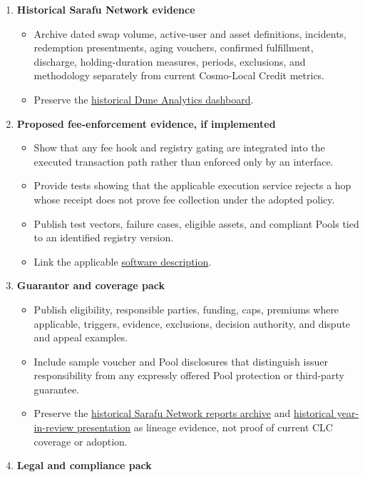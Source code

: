 \documentclass[11pt]{article}
\begin{document}
\begin{enumerate}[leftmargin=*]
\item \textbf{Historical Sarafu Network evidence}
\begin{itemize}[leftmargin=*]
\item Archive dated swap volume, active-user and asset definitions, incidents, redemption presentments, aging vouchers, confirmed fulfillment, discharge, holding-duration measures, periods, exclusions, and methodology separately from current Cosmo-Local Credit metrics.
\item Preserve the \href{https://dune.com/grassrootseconomics/sarafu-network}{historical Dune Analytics dashboard}.
\end{itemize}
\item \textbf{Proposed fee-enforcement evidence, if implemented}
\begin{itemize}[leftmargin=*]
\item Show that any fee hook and registry gating are integrated into the executed transaction path rather than enforced only by an interface.
\item Provide tests showing that the applicable execution service rejects a hop whose receipt does not prove fee collection under the adopted policy.
\item Publish test vectors, failure cases, eligible assets, and compliant Pools tied to an identified registry version.
\item Link the applicable \href{https://software.grassecon.org}{software description}.
\end{itemize}
\item \textbf{Guarantor and coverage pack}
\begin{itemize}[leftmargin=*]
\item Publish eligibility, responsible parties, funding, caps, premiums where applicable, triggers, evidence, exclusions, decision authority, and dispute and appeal examples.
\item Include sample voucher and Pool disclosures that distinguish issuer responsibility from any expressly offered Pool protection or third-party guarantee.
\item Preserve the \href{https://sarafu.network/reports}{historical Sarafu Network reports archive} and \href{https://youtu.be/5yGaP31bvs0?si=fZ-AMTEXsmVR8Ulv}{historical year-in-review presentation} as lineage evidence, not proof of current CLC coverage or adoption.
\end{itemize}
\item \textbf{Legal and compliance pack}

\end{enumerate}
\end{document}
